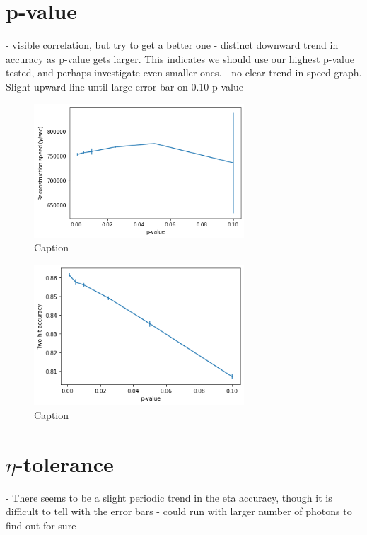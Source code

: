 \section{p-value}
- visible correlation, but try to get a better one
- distinct downward trend in accuracy as p-value gets larger. This indicates we should use our highest p-value tested, and perhaps investigate even smaller ones.
- no clear trend in speed graph. Slight upward line until large error bar on 0.10 p-value

\begin{figure}
    \centering
    \includegraphics[width=0.7\textwidth]{graphs/pi_p_speed.png}
    \caption{Caption}
    \label{fig:my_label}
\end{figure}

\begin{figure}
    \centering
    \includegraphics[width=0.7\textwidth]{graphs/pi_p_acc.png}
    \caption{Caption}
    \label{fig:my_label}
\end{figure}

\section{$\eta$-tolerance}
- There seems to be a slight periodic trend in the eta accuracy, though it is difficult to tell with the error bars
- could run with larger number of photons to find out for sure

